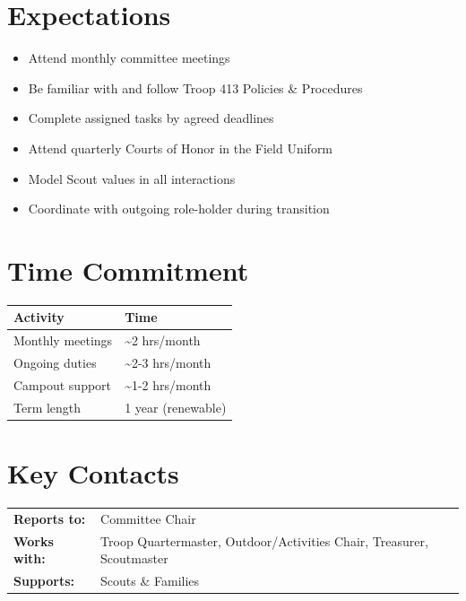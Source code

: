 \documentclass[11pt, letterpaper]{article}
\begin{document}
\hfill
\begin{minipage}[t]{0.48\linewidth}
\raggedright

\section{Expectations}
\begin{itemize}
  \item Attend monthly committee meetings
  \item Be familiar with and follow Troop 413 Policies \& Procedures
  \item Complete assigned tasks by agreed deadlines
  \item Attend quarterly Courts of Honor in the Field Uniform
  \item Model Scout values in all interactions
  \item Coordinate with outgoing role-holder during transition
\end{itemize}

\section{Time Commitment}
\begin{tabular}{@{}p{3.0cm} p{3.8cm}@{}}
  \toprule
  \textbf{Activity} & \textbf{Time} \\
  \midrule
  Monthly meetings  & \textasciitilde{}2 hrs/month \\
  Ongoing duties    & \textasciitilde{}2-3 hrs/month \\
  Campout support   & \textasciitilde{}1-2 hrs/month \\
  Term length       & 1 year (renewable) \\
  \bottomrule
\end{tabular}

\vspace{1em}

\section{Key Contacts}
\begin{tabular}{@{}p{2.6cm} >{\raggedright\arraybackslash}p{4.2cm}@{}}
  \textbf{Reports to:}  & Committee Chair \\
  \textbf{Works with:}  & Troop Quartermaster, Outdoor/Activities Chair, Treasurer, Scoutmaster \\
  \textbf{Supports:}    & Scouts \& Families \\
\end{tabular}

\end{minipage}
\end{document}
